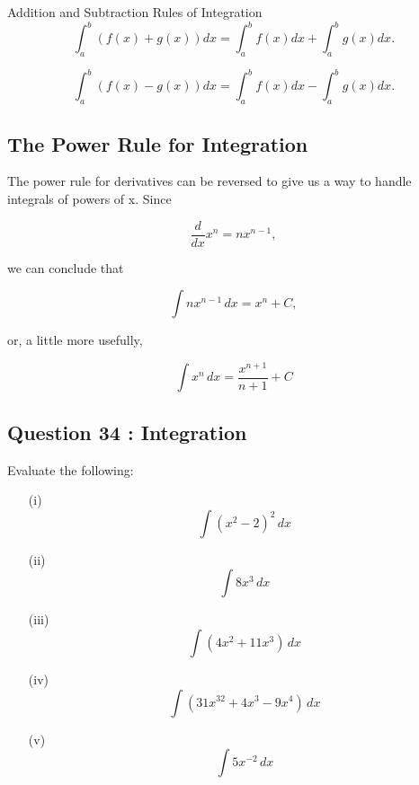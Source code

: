 \documentclass[]{article}
\begin{document}
%


Addition and Subtraction Rules of Integration
\[\int_a^b (f(x) + g(x)) dx = \int_a^b f(x) dx + \int_a^b g(x) dx.\]

\[\int_a^b (f(x) - g(x)) dx = \int_a^b f(x) dx - \int_a^b g(x) dx.\]


%
%
%
%



\subsection*{The Power Rule for Integration}
The power rule for derivatives can be reversed to give us a way to handle integrals of powers of x. Since

\[\frac{d}{dx} x^n = n x^{n-1},\]

we can conclude that

\[\int n x^{n-1} \, dx = x^n + C,\]

or, a little more usefully,

\[\int x^n \, dx = \frac{x^{n+1}}{n+1} + C\]
\subsection*{Question 34 : Integration}
Evaluate the following:
\begin{multicols}{2}
	\begin{itemize}
		
		\item[(i)] \[\int (x^2-2)^{2}\, dx\]
		\item[(ii)] \[\int 8x^3\, dx\]
		\item[(iii)]\[ \int (4x^2+11x^3)\, dx\]
		\item[(iv)] \[\int (31x^{32}+4x^3-9x^4) \,dx\]
		\item[(v)] \[\int 5x^{-2}\, dx\]
	\end{itemize}
\end{multicols}
\end{document}
